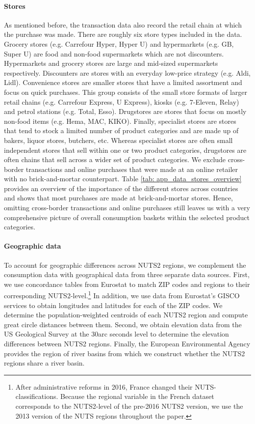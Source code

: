 \paragraph{Stores}  As mentioned before, the transaction data also record the retail chain at which the purchase was made. There are roughly six store types included in the data. Grocery stores (e.g. Carrefour Hyper, Hyper U) and hypermarkets (e.g. GB, Super U) are food and non-food supermarkets which are not discounters. Hypermarkets and grocery stores are large and mid-sized supermarkets respectively. Discounters are stores with an everyday low-price strategy (e.g. Aldi, Lidl). Convenience stores are smaller stores that have a limited assortment and focus on quick purchases. This group consists of the small store formats of larger retail chains (e.g. Carrefour Express, U Express), kiosks (e.g. 7-Eleven, Relay) and petrol stations (e.g. Total, Esso). Drugstores are stores that focus on mostly non-food items (e.g. Hema, MAC, KIKO). Finally, specialist stores are stores that tend to stock a limited number of product categories and are made up of bakers, liquor stores, butchers, etc. Whereas specialist stores are often small independent stores that sell within one or two product categories, drugstores are often chains that sell across a wider set of product categories. We exclude cross-border transactions and online purchases that were made at an online retailer with no brick-and-mortar counterpart. Table \ref{tab: app_data_stores_overview} provides an overview of the importance of the different stores across countries and shows that most purchases are made at brick-and-mortar stores. Hence, omitting cross-border transactions and online purchases still leaves us with a very comprehensive picture of overall consumption baskets within the selected product categories. 

\paragraph{Geographic data} To account for geographic differences across NUTS2 regions, we complement the consumption data with geographical data from three separate data sources. First, we use concordance tables from Eurostat to match ZIP codes and regions to their corresponding NUTS2-level.\footnote{After administrative reforms in 2016, France changed their NUTS-classifications. Because the regional variable in the French dataset corresponds to the NUTS2-level of the pre-2016 NUTS2 version, we use the 2013 version of the NUTS regions throughout the paper.} In addition, we use data from Eurostat's GISCO services to obtain longitudes and latitudes for each of the ZIP codes. We determine the population-weighted centroids of each NUTS2 region and compute great circle distances between them. Second, we obtain elevation data from the US Geological Survey at the 30arc seconds level to determine the elevation differences between NUTS2 regions. Finally, the European Environmental Agency provides the region of river basins from which we construct whether the NUTS2 regions share a river basin. 
